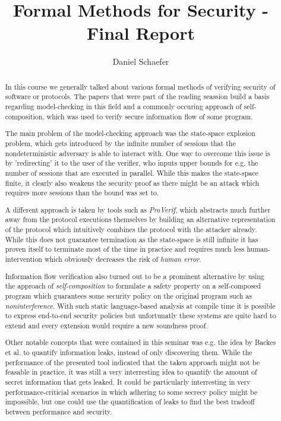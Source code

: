 \documentclass[a4paper,UKenglish]{lipics-v2018}
\title{Formal Methods for Security - Final Report}
\author{Daniel Schaefer}{2549458}{}{}{}
\begin{document}
\maketitle

\begin{abstract}
In this course we generally talked about various formal methods of verifying security of software or protocols. The papers that were part of the reading seassion build a basis regarding model-checking in this field and a commonly occuring approach of self-composition, which was used to verify secure information flow of some program.

The main problem of the model-checking approach was the state-space explosion problem, which gets introduced by the infinite number of sessions that the nondeterministic adversary is able to interact with. One way to overcome this issue is by 'redirecting' it to the user of the verifier, who inputs upper bounds for e.g. the number of sessions that are executed in parallel. While this makes the state-space finite, it clearly also weakens the security proof as there might be an attack which requires more sessions than the bound was set to.

A different approach is taken by tools such as \textit{ProVerif}, which abstracts much further away from the protocol executions themselves by building an alternative representation of the protocol which intuitively combines the protocol with the attacker already. While this does not guarantee termination as the state-space is still infinite it has proven itself to terminate most of the time in practice and requires much less human-intervention which obviously decreases the risk of \textit{human error}.

Information flow verification also turned out to be a prominent alternative by using the approach of \textit{self-composition} to formulate a safety property on a self-composed program which guarantees some security policy on the original program such as \textit{noninterference}. With such static language-based analysis at compile time it is possible to express end-to-end security policies but unfortunatly these systems are quite hard to extend and every extension would require a new soundness proof.

Other notable concepts that were contained in this seminar was e.g. the idea by Backes et al. to quantify information leaks, instead of only discovering them. While the performance of the presented tool indicated that the taken approach might not be feasable in practice, it was still a very interresting idea to quantify the amount of secret information that gets leaked. It could be particularly interresting in very performance-criticial scenarios in which adhering to some secrecy policy might be impossible, but one could use the quantification of leaks to find the best tradeoff between performance and security.


\end{abstract}
\end{document}
